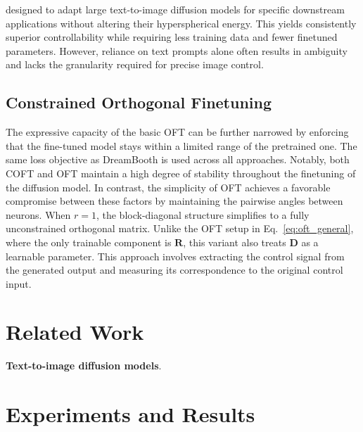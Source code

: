 \begin{itemize}[leftmargin=*,nosep]
designed to adapt large text-to-image diffusion models for specific downstream applications without altering their hyperspherical energy. This yields consistently superior controllability while requiring less training data and fewer finetuned parameters. However, reliance on text prompts alone often results in ambiguity and lacks the granularity required for precise image control. \subsection{Constrained Orthogonal Finetuning}

The expressive capacity of the basic OFT can be further narrowed by enforcing that the fine-tuned model stays within a limited range of the pretrained one. The same loss objective as DreamBooth is used across all approaches. Notably, both COFT and OFT maintain a high degree of stability throughout the finetuning of the diffusion model. In contrast, the simplicity of OFT achieves a favorable compromise between these factors by maintaining the pairwise angles between neurons. When $r=1$, the block-diagonal structure simplifies to a fully unconstrained orthogonal matrix. Unlike the OFT setup in Eq.~\eqref{eq:oft_general}, where the only trainable component is $\bm{R}$, this variant also treats $\bm{D}$ as a learnable parameter. This approach involves extracting the control signal from the generated output and measuring its correspondence to the original control input. \end{itemize}

\section{Related Work}

\textbf{Text-to-image diffusion models}. \section{Experiments and Results}

